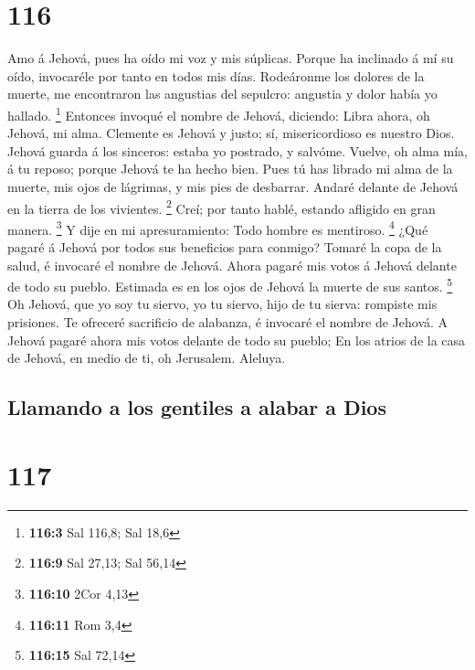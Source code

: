 \hypertarget{section-115}{%
\section{116}\label{section-115}}

 Amo á Jehová, pues ha oído mi voz y mis súplicas.
 Porque ha inclinado á mí su oído, invocaréle por tanto en
todos mis días.  Rodeáronme los dolores de la muerte, me
encontraron las angustias del sepulcro: angustia y dolor había yo
hallado. \footnote{\textbf{116:3} Sal 116,8; Sal 18,6} 
Entonces invoqué el nombre de Jehová, diciendo: Libra ahora, oh Jehová,
mi alma.  Clemente es Jehová y justo; sí, misericordioso es
nuestro Dios.  Jehová guarda á los sinceros: estaba yo
postrado, y salvóme.  Vuelve, oh alma mía, á tu reposo;
porque Jehová te ha hecho bien.  Pues tú has librado mi alma
de la muerte, mis ojos de lágrimas, y mis pies de desbarrar.
 Andaré delante de Jehová en la tierra de los vivientes.
\footnote{\textbf{116:9} Sal 27,13; Sal 56,14}  Creí; por
tanto hablé, estando afligido en gran manera. \footnote{\textbf{116:10}
  2Cor 4,13}  Y dije en mi apresuramiento: Todo hombre es
mentiroso. \footnote{\textbf{116:11} Rom 3,4}  ¿Qué pagaré
á Jehová por todos sus beneficios para conmigo?  Tomaré la
copa de la salud, é invocaré el nombre de Jehová.  Ahora
pagaré mis votos á Jehová delante de todo su pueblo. 
Estimada es en los ojos de Jehová la muerte de sus santos. \footnote{\textbf{116:15}
  Sal 72,14}  Oh Jehová, que yo soy tu siervo, yo tu
siervo, hijo de tu sierva: rompiste mis prisiones.  Te
ofreceré sacrificio de alabanza, é invocaré el nombre de Jehová.
 A Jehová pagaré ahora mis votos delante de todo su pueblo;
 En los atrios de la casa de Jehová, en medio de ti, oh
Jerusalem. Aleluya.

\hypertarget{llamando-a-los-gentiles-a-alabar-a-dios}{%
\subsection{Llamando a los gentiles a alabar a
Dios}\label{llamando-a-los-gentiles-a-alabar-a-dios}}

\hypertarget{section-116}{%
\section{117}\label{section-116}}

